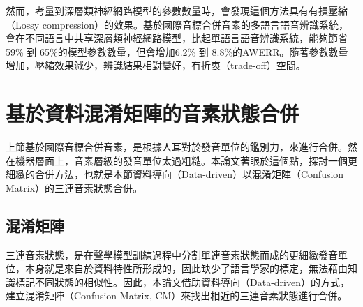 然而，考量到深層類神經網路模型的參數數量時，會發現這個方法具有有損壓縮（Lossy compression）的效果。基於國際音標合併音素的多語言語音辨識系統，會在不同語言中共享深層類神經網路模型，比起單語言語音辨識系統，能夠節省59\% 到 65\%的模型參數數量，但會增加6.2\% 到 8.8\%的AWERR。隨著參數數量增加，壓縮效果減少，辨識結果相對變好，有折衷（trade-off）空間。

\section{基於資料混淆矩陣的音素狀態合併}
上節基於國際音標合併音素，是根據人耳對於發音單位的鑑別力，來進行合併。然在機器層面上，音素層級的發音單位太過粗糙。本論文著眼於這個點，探討一個更細緻的合併方法，也就是本節資料導向（Data-driven）以混淆矩陣（Confusion Matrix）的三連音素狀態合併。


\subsection{混淆矩陣}
三連音素狀態，是在聲學模型訓練過程中分割單連音素狀態而成的更細緻發音單位，本身就是來自於資料特性所形成的，因此缺少了語言學家的標定，無法藉由知識標記不同狀態的相似性。因此，本論文借助資料導向（Data-driven）的方式，建立混淆矩陣（Confusion Matrix, CM）來找出相近的三連音素狀態進行合併。

